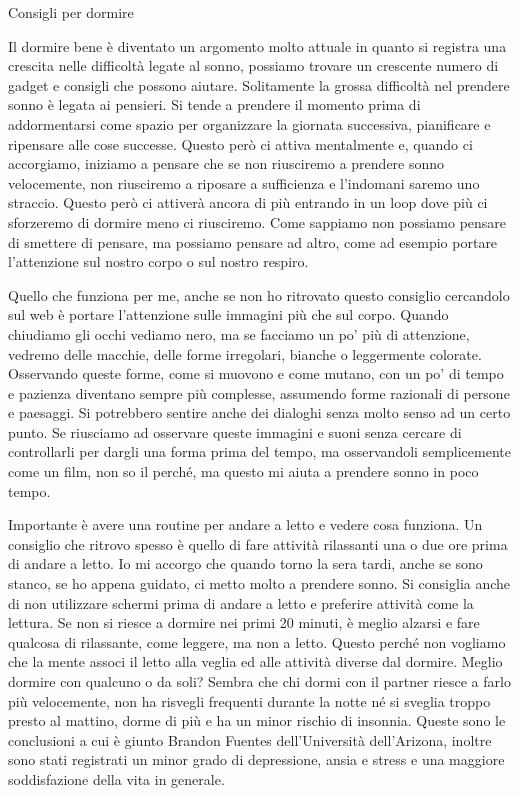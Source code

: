 \documentclass[12pt]{book} %
\begin{document}
\bigskip
\begin{mdframed}[linewidth=1pt]
Consigli per dormire

Il dormire bene è diventato un argomento molto attuale in quanto si registra una crescita nelle difficoltà legate al
sonno, possiamo trovare un crescente numero di gadget e consigli che possono aiutare. Solitamente la grossa difficoltà
nel prendere sonno è legata ai pensieri. Si tende a prendere il momento prima di addormentarsi come spazio per
organizzare la giornata successiva, pianificare e ripensare alle cose successe. Questo però ci attiva mentalmente e,
quando ci accorgiamo, iniziamo a pensare che se non riusciremo a prendere sonno velocemente, non riusciremo a riposare
a sufficienza e l'indomani saremo uno straccio. Questo però ci attiverà ancora di più entrando in
un loop dove più ci sforzeremo di dormire meno ci riusciremo. Come sappiamo non possiamo pensare di smettere di
pensare, ma possiamo pensare ad altro, come ad esempio portare l'attenzione sul nostro corpo o sul
nostro respiro. 

Quello che funziona per me, anche se non ho ritrovato questo consiglio cercandolo sul web è portare
l'attenzione sulle immagini più che sul corpo. Quando chiudiamo gli occhi vediamo nero, ma se
facciamo un po' più di attenzione, vedremo delle macchie, delle forme irregolari, bianche o
leggermente colorate. Osservando queste forme, come si muovono e come mutano, con un po' di tempo
e pazienza diventano sempre più complesse, assumendo forme razionali di persone e paesaggi. Si potrebbero sentire anche
dei dialoghi senza molto senso ad un certo punto. Se riusciamo ad osservare queste immagini e suoni senza cercare di
controllarli per dargli una forma prima del tempo, ma osservandoli semplicemente come un film, non so il perché, ma
questo mi aiuta a prendere sonno in poco tempo.

Importante è avere una routine per andare a letto e vedere cosa funziona. Un consiglio che ritrovo spesso è quello di
fare attività rilassanti una o due ore prima di andare a letto. Io mi accorgo che quando torno la sera tardi, anche se
sono stanco, se ho appena guidato, ci metto molto a prendere sonno. Si consiglia anche di non utilizzare schermi prima
di andare a letto e preferire attività come la lettura. Se non si riesce a dormire nei primi 20 minuti, è meglio
alzarsi e fare qualcosa di rilassante, come leggere, ma non a letto. Questo perché non vogliamo che la mente associ il
letto alla veglia ed alle attività diverse dal dormire. Meglio dormire con qualcuno o da soli? Sembra che chi dormi con
il partner riesce a farlo più velocemente, non ha risvegli frequenti durante la notte né si sveglia troppo presto al
mattino, dorme di più e ha un minor rischio di insonnia. Queste sono le conclusioni a cui è giunto Brandon Fuentes
dell'Università dell'Arizona, inoltre sono stati registrati un minor grado di depressione, ansia e stress e una
maggiore soddisfazione della vita in generale. 


\end{mdframed}
\end{document}
